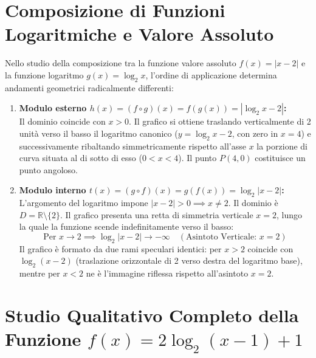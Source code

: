 \documentclass[11pt,a4paper,oneside]{report}
\begin{document}
\section{Composizione di Funzioni Logaritmiche e Valore Assoluto}

Nello studio della composizione tra la funzione valore assoluto $f(x) = |x - 2|$ e la funzione logaritmo $g(x) = \log_2 x$, l'ordine di applicazione determina andamenti geometrici radicalmente differenti:

\begin{enumerate}[label=\textbf{\alph*.}]
\item \textbf{Modulo esterno $h(x) = (f \circ g)(x) = f(g(x)) = |\log_2 x - 2|$:}\\
Il dominio coincide con $x > 0$. Il grafico si ottiene traslando verticalmente di 2 unit\`a verso il basso il logaritmo canonico ($y = \log_2 x - 2$, con zero in $x = 4$) e successivamente ribaltando simmetricamente rispetto all'asse $x$ la porzione di curva situata al di sotto di esso ($0 < x < 4$). Il punto $P(4, 0)$ costituisce un punto angoloso.

\item \textbf{Modulo interno $t(x) = (g \circ f)(x) = g(f(x)) = \log_2 |x - 2|$:}\\
L'argomento del logaritmo impone $|x - 2| > 0 \implies x \neq 2$. Il dominio \`e $D = \mathbb{R} \setminus \{2\}$. Il grafico presenta una retta di simmetria verticale $x = 2$, lungo la quale la funzione scende indefinitamente verso il basso:
\begin{equation}
\text{Per } x \to 2 \implies \log_2 |x - 2| \to -\infty \quad (\text{Asintoto Verticale: } x = 2)
\end{equation}
Il grafico \`e formato da due rami speculari identici: per $x > 2$ coincide con $\log_2(x - 2)$ (traslazione orizzontale di 2 verso destra del logaritmo base), mentre per $x < 2$ ne \`e l'immagine riflessa rispetto all'asintoto $x = 2$.
\end{enumerate}

\section{Studio Qualitativo Completo della Funzione $f(x) = 2\log_2(x - 1) + 1$}
\end{document}
